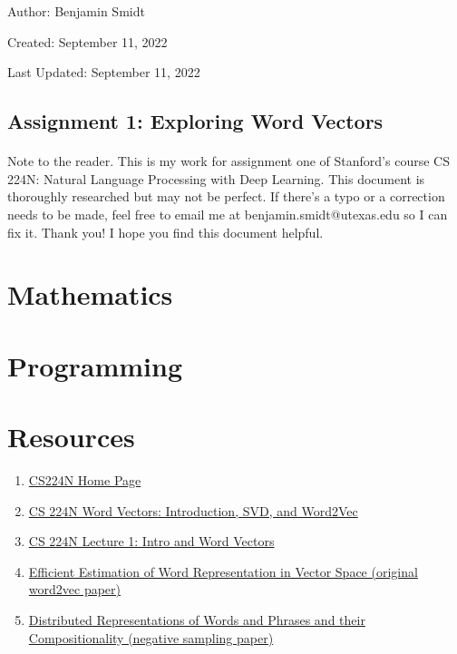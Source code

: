 \documentclass[12pt]{article}
\begin{document}
\noindent Author: Benjamin Smidt

\noindent Created: September 11, 2022

\noindent Last Updated: September 11, 2022
\begin{center}
\section*{Assignment 1: Exploring Word Vectors}
\end{center}

\paragraph{} Note to the reader. This is my work for assignment one of Stanford's course
CS 224N: Natural Language Processing with Deep Learning. This document is thoroughly researched but
may not be perfect. If there's a typo or a correction needs to be made, feel free to 
email me at benjamin.smidt@utexas.edu so I can fix it. Thank you! I hope you find this 
document helpful.

\section{Mathematics}


\section{Programming}

\section{Resources}
\begin{enumerate}
    \item \href{https://web.stanford.edu/class/cs224n/index.html#schedule}{CS224N Home Page}
    \item \href{https://web.stanford.edu/class/cs224n/readings/cs224n-2019-notes01-wordvecs1.pdf}
    {CS 224N Word Vectors: Introduction, SVD, and Word2Vec}
    \item \href{https://www.youtube.com/watch?v=rmVRLeJRkl4}{CS 224N Lecture 1: Intro and Word Vectors}
    \item \href{https://arxiv.org/pdf/1301.3781.pdf}
    {Efficient Estimation of Word Representation in Vector Space (original word2vec paper)}
    \item \href{https://proceedings.neurips.cc/paper/2013/file/9aa42b31882ec039965f3c4923ce901b-Paper.pdf}
    {Distributed Representations of Words and Phrases and their Compositionality (negative sampling paper)}
\end{enumerate}
\end{document}
